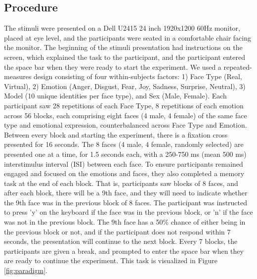 \subsection{Procedure}
\label{sec:Procedure}
The stimuli were presented on a Dell U2415 24 inch 1920x1200 60Hz monitor, placed at eye level, and the participants were seated in a comfortable chair facing the monitor.
The beginning of the stimuli presentation had instructions on the screen, which explained the task to the participant, and the participant entered the space bar when they were ready to start the experiment.
We used a repeated-measures design consisting of four within-subjects factors: 1) Face Type (Real, Virtual), 2) Emotion (Anger, Disgust, Fear, Joy, Sadness, Surprise, Neutral), 3) Model (10 unique identities per face type), and Sex (Male, Female). 
Each participant saw 28 repetitions of each Face Type, 8 repetitions of each emotion across 56 blocks, each comprising eight faces (4 male, 4 female) of the same face type and emotional expression, counterbalanced across Face Type and Emotion. 
Between every block and starting the experiment, there is a fixation cross presented for 16 seconds. 
The 8 faces (4 male, 4 female, randomly selected) are presented one at a time, for 1.5 seconds each, with a 250-750 ms (mean 500 ms) interstimulus interval (ISI) between each face. 
To ensure participants remained engaged and focused on the emotions and faces, they also completed a memory task at the end of each block.
That is, participants saw blocks of 8 faces, and after each block, there will be a 9th face, and they will need to indicate whether the 9th face was in the previous block of 8 faces. 
The participant was instructed to press 'y' on the keyboard if the face was in the previous block, or 'n' if the face was not in the previous block. 
The 9th face has a 50\% chance of either being in the previous block or not, and if the participant does not respond within 7 seconds, the presentation will continue to the next block.
Every 7 blocks, the participants are given a break, and prompted to enter the space bar when they are ready to continue the experiment.
This task is visualized in Figure \ref{fig:paradigm}.

